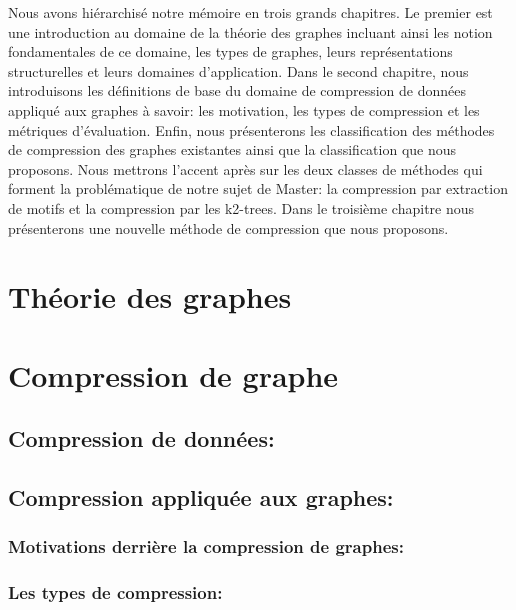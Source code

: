 \documentclass[a4paper,oneside,12pt]{report}
\theoremstyle{definition}
\begin{document}
			
			 Nous avons hiérarchisé notre mémoire en trois grands chapitres. Le premier est une introduction au domaine de la théorie des graphes incluant ainsi les notion fondamentales de ce domaine, les types de graphes, leurs représentations structurelles et leurs domaines d'application. Dans le second chapitre, nous introduisons les définitions de base du domaine de compression de données appliqué aux graphes à savoir: les motivation, les types de compression et les métriques d'évaluation. Enfin, nous présenterons les classification des méthodes de compression des graphes existantes ainsi que la classification que nous proposons. Nous mettrons l'accent après sur les deux classes de méthodes qui forment la problématique de notre sujet de Master: la compression par extraction de motifs et la compression par les k2-trees. Dans le troisième chapitre nous présenterons une nouvelle méthode de compression que nous proposons.
	



	\chapter{ Théorie des graphes}
	  
	

	\chapter{Compression de graphe}
	
		\section{Compression de données: }
			
			
		
		\section{Compression appliquée aux graphes:}
	
			\subsection{Motivations derrière la compression de graphes: }
	
			\subsection{Les types de compression:}
			
			
\end{document}
